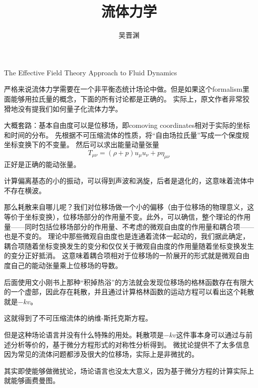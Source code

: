 \documentclass[hyperref, UTF8, a4paper]{ctexart}
\title{流体力学}
\author{吴晋渊}
\begin{document}
\maketitle

The Effective Field Theory Approach to Fluid Dynamics

严格来说流体力学需要在一个非平衡态统计场论中做。但是如果这个formalism里面能够用拉氏量的概念，下面的所有讨论都是正确的。
实际上，原文作者非常狡猾地没有提我们如何量子化流体力学。

大概套路：基本自由度可以是位移场，即comoving coordinates相对于实际的坐标和时间的分布。
先根据不可压缩流体的性质，将“自由场拉氏量”写成一个保度规坐标变换下的不变量。
然后可以求出能量动量张量
\begin{equation}
    T_{\mu \nu} = (\rho + p) u_\mu u_\nu + p \eta_{\mu \nu}
\end{equation}
正好是正确的能动张量。

计算偏离基态的小的振动，可以得到声波和涡旋，后者是退化的，这意味着流体中不存在横波。

那么耗散来自哪儿呢？我们对位移场做一个小的偏移（由于位移场的物理意义，这等价于坐标变换），位移场部分的作用量不变。此外，可以确信，整个理论的作用量——同时包括位移场部分的作用量、不考虑的微观自由度的作用量和耦合项——也是不变的。
理论中那些微观自由度也是连通着流体一起动的，我们据此确定，耦合项随着坐标变换发生的变分和仅仅关于微观自由度的作用量随着坐标变换发生的变分正好抵消。
这意味着耦合项相对于位移场的一阶展开的形式就是微观自由度自己的能动张量乘上位移场的导数。

后面使用文小刚书上那种“积掉热浴”的方法就会发现位移场的格林函数存在有限大的一个虚部，因此存在耗散，并且通过计算格林函数的运动方程可以看出这个耗散就是$-k v$。

这就得到了不可压缩流体的纳维-斯托克斯方程。

但是这种场论语言并没有什么特殊的用处。耗散项是$-kv$这件事本身可以通过与前述分析等价的，基于微分方程形式的对称性分析得到。
微扰论提供不了太多信息因为常见的流体问题都涉及很大的位移场，实际上是非微扰的。

其实即使能够做微扰论，场论语言也没太大意义，因为基于微分方程的计算实际上就能够画费曼图。
\end{document}
